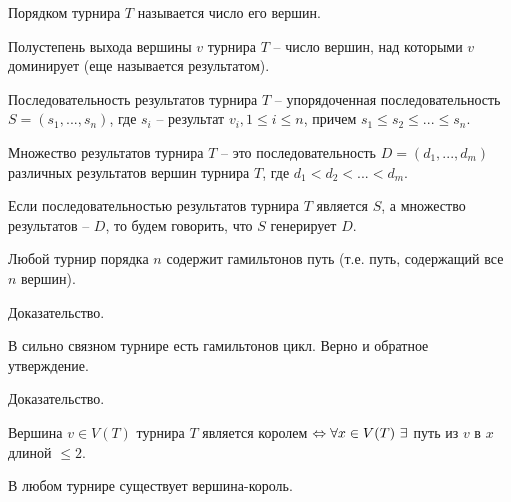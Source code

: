 	\begin{Def}
		Порядком турнира $T$ называется число его вершин.
	\end{Def}

	\begin{Def}
		Полустепень выхода вершины $v$ турнира $T$ -- число вершин, над которыми $v$ доминирует (еще называется результатом).
	\end{Def}

	\begin{Def}
		Последовательность результатов турнира $T$ -- упорядоченная последовательность 
		$S = (s_1, ..., s_n)$, где $s_i$ -- результат $v_i, 1 \leqslant i \leqslant n$, причем $s_1 \leqslant s_2 \leqslant ... \leqslant s_n$.
	\end{Def}

	\begin{Def}
		Множество результатов турнира $T$ -- это последовательность $D = (d_1, ..., d_m)$ различных результатов
		вершин турнира $T$, где $d_1 < d_2 < ... < d_m$.
	\end{Def}

	\begin{Def}
		Если последовательностью результатов турнира $T$ является $S$, а множество результатов -- $D$, то будем говорить, что $S$ генерирует $D$.
	\end{Def}

	\begin{Thm}
		Любой турнир порядка $n$ содержит гамильтонов путь (т.е. путь, содержащий все $n$ вершин).
	\end{Thm}

	\begin{Ex}
		Доказательство.
	\end{Ex}

	\begin{Thm}
		В сильно связном турнире есть гамильтонов цикл. Верно и обратное утверждение.		
	\end{Thm}

	\begin{Ex}
		Доказательство.
	\end{Ex}

	\begin{Def}
		Вершина $v \in V(T)$ турнира $T$ является королем $\EQ \forall x \in V(T) \ \exists$ путь из $v$ в $x$ длиной $\leqslant 2$. 
	\end{Def}

	\begin{Thm}
		В любом турнире существует вершина-король.
	\end{Thm}

